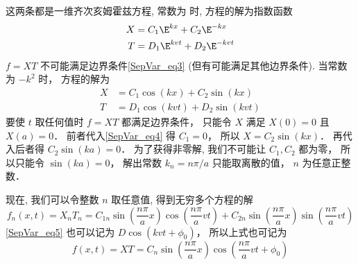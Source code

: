 这两条都是一维齐次亥姆霍兹方程, 常数为 时, 方程的解为指数函数
\begin{align}
X &= C_1 \E^{kx} + C_2 \E^{-kx}\\
T &= D_1 \E^{kvt} + D_2 \E^{-kvt}
\end{align}
$f = XT$ 不可能满足边界条件\autoref{SepVar_eq3}  (但有可能满足其他边界条件). 当常数为 $-k^2$ 时， 方程的解为
\begin{align}\label{SepVar_eq4}
X &= C_1 \cos(kx) + C_2 \sin(kx)\\
\label{SepVar_eq5}T &= D_1 \cos(kvt) + D_2 \sin(kvt)
\end{align}
要使 $t$ 取任何值时 $f = XT$ 都满足边界条件， 只能令 $X$ 满足 $X(0) = 0$ 且 $X(a) = 0$． 前者代入\autoref{SepVar_eq4} 得 $C_1 = 0$， 所以 $X = C_2\sin(kx)$． 再代入后者得 $C_2\sin(ka) = 0$． 为了获得非零解, 我们不可能让 $C_1, C_2$ 都为零， 所以只能令 $\sin(ka) = 0$， 解出常数 $k_n = n\pi/a$ 只能取离散的值， $n$ 为任意正整数．

现在, 我们可以令整数 $n$ 取任意值, 得到无穷多个方程的解
\begin{equation}
f_n(x, t) = X_n T_n = C_{1n} \sin(\frac{n\pi}{a}x)\cos(\frac{n\pi}{a} vt) + C_{2n}\sin(\frac{n\pi}{a}x)\sin(\frac{n\pi}{a}vt)
\end{equation}
\autoref{SepVar_eq5} 也可以记为 $D\cos(kvt+\phi_0)$， 所以上式也可记为
\begin{equation}
f(x, t) = XT = C_n\sin(\frac{n\pi}{a}x)\cos(\frac{n\pi}{a}vt + \phi_0)
\end{equation}


